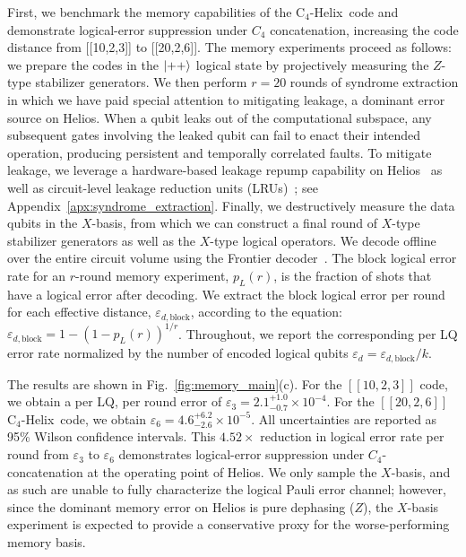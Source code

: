 \documentclass[aps,prx,reprint,showpacs,twocolumn,superscriptaddress,eqsecnum]{revtex4-2}
\newcommand{\chelix}{C$_4$-Helix}
\begin{document}
First, we benchmark the memory capabilities of the \chelix\ code and demonstrate logical-error suppression under $C_4$ concatenation, increasing the code distance from [[10,2,3]] to [[20,2,6]]. 
The memory experiments proceed as follows: we prepare the codes in the $\ket{++}$ logical state by projectively measuring the $Z$-type stabilizer generators. We then perform $r=20$ rounds of syndrome extraction in which we have paid special attention to mitigating leakage, a dominant error source on Helios. When a qubit leaks out of the computational subspace, any subsequent gates involving the leaked qubit can fail to enact their intended operation, producing persistent and temporally correlated faults. To mitigate leakage, we leverage a hardware-based leakage repump capability on Helios~\cite{lavasani2026} as well as circuit-level leakage reduction units (LRUs)~\cite{paetznick2024}; see Appendix~\ref{apx:syndrome_extraction}. 
Finally, we destructively measure the data qubits in the $X$-basis, from which we can construct a final round of $X$-type stabilizer generators as well as the $X$-type logical operators. 
We decode offline over the entire circuit volume using the Frontier decoder~\cite{leverrier2026}. The block logical error rate for an $r$-round memory experiment, $p_L(r)$, is the fraction of shots that have a logical error after decoding. We extract the block logical error per round for each effective distance, $\varepsilon_{d,\text{block}}$, according to the equation: $\varepsilon_{d,\text{block}} = 1 - (1 - p_L(r))^{1/r}$. Throughout, we report the corresponding per LQ error rate normalized by the number of encoded logical qubits $\varepsilon_d = \varepsilon_{d,\text{block}} / k$.

The results are shown in Fig.~\ref{fig:memory_main}(c). For the $[[10,2,3]]$ code, we obtain a per LQ, per round error of $\varepsilon_3 = 2.1^{+1.0}_{-0.7}\times10^{-4}$. 
For the $[[20,2,6]]$ \chelix\ code, we obtain $\varepsilon_6 = 4.6^{+6.2}_{-2.6}\times10^{-5}$.
All uncertainties are reported as 95\% Wilson confidence intervals. This $4.52\times$ reduction in logical error rate per round from $\varepsilon_3$ to $\varepsilon_6$ demonstrates logical-error suppression under $C_4$-concatenation at the operating point of Helios. 
We only sample the $X$-basis, and as such are unable to fully characterize the logical Pauli error channel; however, since the dominant memory error on Helios is pure dephasing ($Z$), the $X$-basis experiment is expected to provide a conservative proxy for the worse-performing memory basis.
\end{document}
